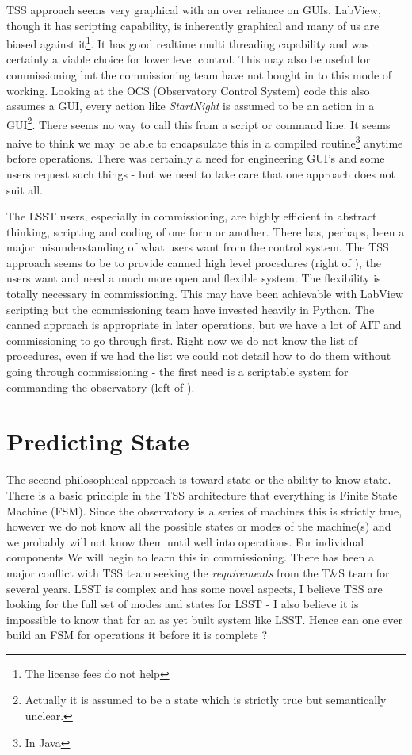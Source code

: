 TSS approach seems very graphical with an over  reliance on GUIs.
LabView, though it has scripting capability, is inherently graphical and many of us are biased against it\footnote{The license fees do not help}. It has good realtime multi threading capability and was certainly a viable choice for lower level control.
This may also be useful for commissioning but the commissioning team have not bought in to this mode of working.
 Looking at the OCS (Observatory Control System)  code this also assumes a GUI, every action like {\em StartNight} is assumed to be an action in a GUI\footnote{Actually it is assumed to be a state which is strictly true but semantically unclear. }.
There seems no way to call this from a script or command line. It seems naive to think we may be able to encapsulate this in a compiled routine\footnote{In Java} anytime before operations. There was certainly a need for engineering GUI's and some users request such things - but we need to take care that one approach does not suit all.


The LSST users, especially in commissioning, are highly efficient in abstract thinking, scripting and coding of one form or another. There has, perhaps,  been  a major misunderstanding of what users want from the control system. The TSS approach seems to be to provide canned high level procedures (right of ), the users want and need a much more open and flexible system.
The flexibility is totally necessary in commissioning. This may have been achievable with LabView scripting but the commissioning team have invested heavily in Python.
The canned approach is appropriate in later operations, but we have  a lot of AIT and commissioning to go through first.
Right now we do not know the list of procedures, even if we had the list we could not detail how to do them without going through commissioning - the first need is a scriptable system for commanding the observatory (left of ).


\section{Predicting State}
The second philosophical approach is toward state or the ability to know state. There is a basic principle in the TSS architecture that everything is  Finite State Machine (FSM).
Since the observatory is a series of machines this is strictly true, however we do not know all the possible states or modes of the machine(s)  and we probably will not know them until well into operations. For individual components
We will begin to learn this in commissioning. There has been a major conflict with  TSS team seeking the {\em requirements} from the T\&S team for several years.  LSST is complex and has some novel aspects, I believe TSS are looking for the full set of modes and states for LSST - I also believe it is impossible to know that for an as yet built system like LSST. Hence can one ever build an FSM for operations it before it is complete ?

